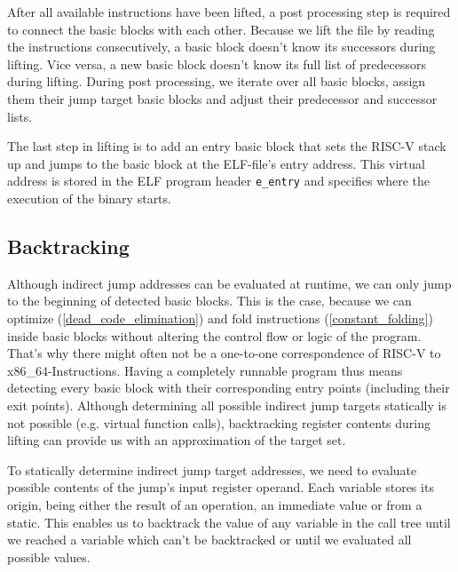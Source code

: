 \documentclass[course=eragp]{aspdoc}
\begin{document}
After all available instructions have been lifted, a post processing step is required to connect
the basic blocks with each other. Because we lift the file by reading the instructions
consecutively, a basic block doesn't know its successors during lifting. Vice versa, a new basic
block doesn't know its full list of predecessors during lifting.
During post processing, we iterate over all basic blocks, assign them their jump target basic
blocks and adjust their predecessor and successor lists.

\par

The last step in lifting is to add an entry basic block that sets the RISC-V stack up and jumps to the
basic block at the ELF-file's entry address. This virtual address is stored in the ELF program header
\texttt{e\_entry} and specifies where the execution of the binary starts.\cite[p.~5]{elf_spec}


\subsection{Backtracking}\label{backtracking}
Although indirect jump addresses can be evaluated at runtime, we can only jump to the beginning of
detected basic blocks. This is the case, because we can optimize (\ref{dead_code_elimination}) and fold
instructions (\ref{constant_folding}) inside basic blocks without altering the control flow or
logic of the program. That's why there might often not be a one-to-one correspondence of RISC-V to x86\_64-Instructions.
Having a completely runnable program thus means detecting every basic block
with their corresponding entry points (including their exit points). Although determining all possible
indirect jump targets statically is not possible (e.g. virtual function calls),
backtracking register contents during lifting can provide us with
an approximation of the target set.

\par

To statically determine indirect jump target addresses, we need to evaluate possible contents of
the jump's input register operand. Each variable stores its origin, being either the result of an
operation, an immediate value or from a static. This enables us to backtrack the value of
any variable in the call tree until we reached a variable which can't be backtracked or until we evaluated
all possible values.
\end{document}
